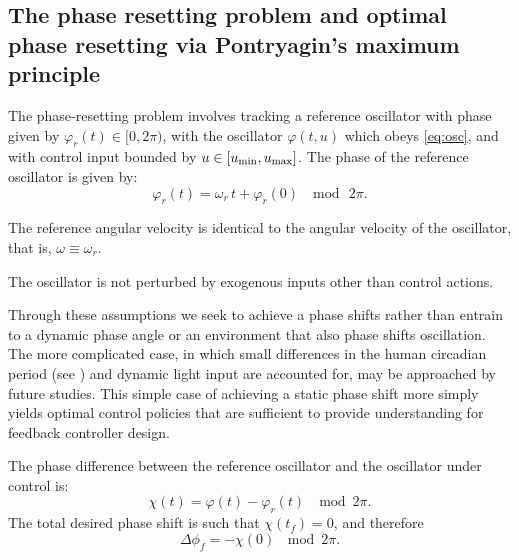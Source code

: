 \subsection*{The phase resetting problem and optimal phase resetting via Pontryagin's maximum principle \label{ssec:optimal}}

The phase-resetting problem involves tracking a reference oscillator with phase given by $\varphi_r(t)\in[0,2\pi)$, with the oscillator $\varphi(t,u)$ which obeys \eqref{eq:osc}, and with control input bounded by $u\in[u_{\rm min}, u_{\rm max}]$.
The phase of the reference oscillator is given by:
\[
    \varphi_r(t) = \omega_r\,t+\varphi_r(0) \; \mod\,2\pi.
\]

\begin{asm}
    The reference angular velocity is identical to the angular velocity of the oscillator, that is, $\omega\equiv\omega_r$.
\end{asm}
\begin{asm}
    The oscillator is not perturbed by exogenous inputs other than control actions.
\end{asm}
    Through these assumptions we seek to achieve a phase shifts rather than entrain to a dynamic phase angle or an environment that also phase shifts oscillation.
    The more complicated case, in which small differences in the human circadian period (see \cite{Czeisler1999}) and dynamic light input are accounted for, may be approached by future studies.
This simple case of achieving a static phase shift more simply yields optimal control policies that are sufficient to provide understanding for feedback controller design.

The phase difference between the reference oscillator and the oscillator under control is:
\begin{equation*}
    \chi(t) = \varphi(t)-\varphi_r(t) \; \mod2\pi.
\end{equation*}
The total desired phase shift is such that $\chi(t_f) = 0$, and therefore
\begin{equation*}
\Delta\phi_f = -\chi(0)\,\mod2\pi.
\end{equation*}

